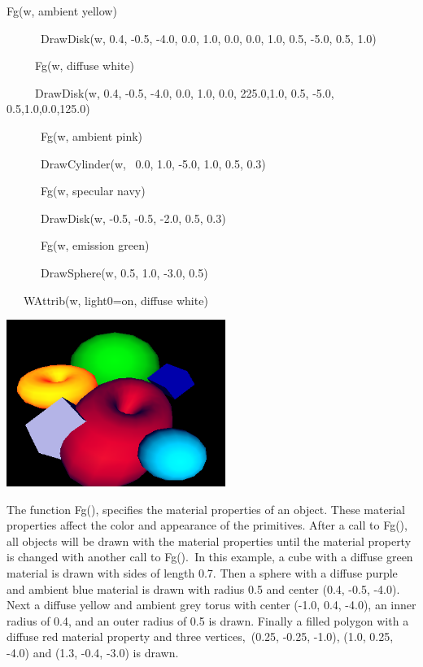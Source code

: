\documentclass[letterpaper]{article}
\begin{document}
\bigskip

{\sffamily
Fg(w, {\textquotedbl}ambient yellow{\textquotedbl})}

{\sffamily
\ \ \ \ \ \ DrawDisk(w, 0.4, -0.5, -4.0, 0.0, 1.0, 0.0, 0.0, 1.0, 0.5, -5.0, 0.5, 1.0) \ \ }

{\sffamily
\ \ \ \ \ Fg(w, {\textquotedbl}diffuse white{\textquotedbl})}

{\sffamily
\ \ \ \ \ DrawDisk(w, 0.4, -0.5, -4.0, 0.0, 1.0, 0.0, 225.0,1.0, 0.5, -5.0, 0.5,1.0,0.0,125.0)}

{\sffamily
\ \ \ \ \ \ Fg(w, {\textquotedbl}ambient pink{\textquotedbl})}

{\sffamily
\ \ \ \ \ \ DrawCylinder(w, \ 0.0, 1.0, -5.0, 1.0, 0.5, 0.3)}

{\sffamily
\ \ \ \ \ \ Fg(w, {\textquotedbl}specular navy{\textquotedbl})}

{\sffamily
\ \ \ \ \ \ DrawDisk(w, -0.5, -0.5, -2.0, 0.5, 0.3)}

{\sffamily
\ \ \ \ \ \ Fg(w, {\textquotedbl}emission green{\textquotedbl})}

{\sffamily
\ \ \ \ \ \ DrawSphere(w, 0.5, 1.0, -3.0, 0.5)}

{\sffamily
\ \ \ WAttrib(w, {\textquotedbl}light0=on, diffuse white{\textquotedbl})}

 \includegraphics[width=2.8071in,height=2.1335in]{utr9/utr9-img021.png} 

The function \textsf{Fg()}, specifies the material properties of an
object. These material properties affect the color and appearance of
the primitives. After a call to \textsf{Fg()}, all objects will be
drawn with the material properties until the material property is
changed with another call to \textsf{Fg()}.\texttt{ }In this example,
a cube with a diffuse green material is drawn with sides of length
0.7. Then a sphere with a diffuse purple and ambient blue material is
drawn with radius 0.5 and center \textsf{(0.4, -0.5, -4.0)}. Next a
diffuse yellow and ambient grey torus with center
\textsf{(-1.0, 0.4, -4.0)}, an inner radius of 0.4, and an outer
radius of 0.5 is drawn. Finally a filled polygon with a diffuse red
material property and three vertices,\texttt{ }\textsf{(0.25, -0.25, -1.0)},
\textsf{(1.0, 0.25, -4.0)} and \textsf{(1.3, -0.4, -3.0)} is drawn.
\end{document}
